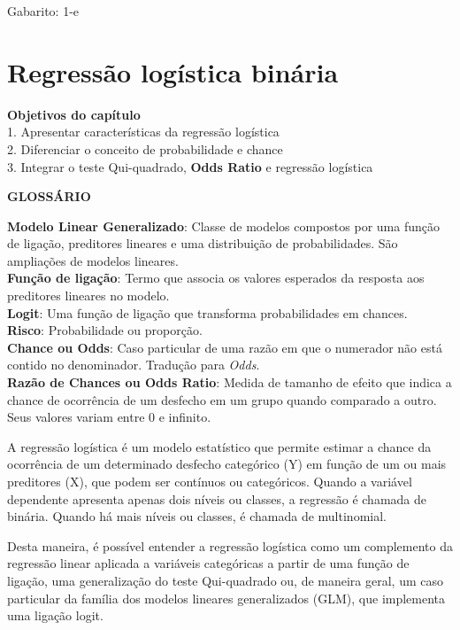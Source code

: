\documentclass[
]{book}
\newenvironment{objectives}{
  \definecolor{shadecolor}{rgb}{0.764,0.992,0.686}  %
  \color{black}
  \begin{shaded}}
 {\end{shaded}}
\begin{document}
Gabarito: 1-e

\hypertarget{regressuxe3o-loguxedstica-binuxe1ria}{%
\chapter{Regressão logística binária}\label{regressuxe3o-loguxedstica-binuxe1ria}}

\begin{objectives}
\textbf{Objetivos do capítulo}\\
1. Apresentar características da regressão logística\\
2. Diferenciar o conceito de probabilidade e chance\\
3. Integrar o teste Qui-quadrado, \textbf{Odds Ratio} e regressão logística

\end{objectives}

\textbf{GLOSSÁRIO}

\textbf{Modelo Linear Generalizado}: Classe de modelos compostos por uma função de ligação, preditores lineares e uma distribuição de probabilidades. São ampliações de modelos lineares.\\
\textbf{Função de ligação}: Termo que associa os valores esperados da resposta aos preditores lineares no modelo.\\
\textbf{Logit}: Uma função de ligação que transforma probabilidades em chances.\\
\textbf{Risco}: Probabilidade ou proporção.\\
\textbf{Chance ou Odds}: Caso particular de uma razão em que o numerador não está contido no denominador. Tradução para \emph{Odds}.\\
\textbf{Razão de Chances ou Odds Ratio}: Medida de tamanho de efeito que indica a chance de ocorrência de um desfecho em um grupo quando comparado a outro. Seus valores variam entre 0 e infinito.

A regressão logística é um modelo estatístico que permite estimar a chance da ocorrência de um determinado desfecho categórico (Y) em função de um ou mais preditores (X), que podem ser contínuos ou categóricos. Quando a variável dependente apresenta apenas dois níveis ou classes, a regressão é chamada de binária. Quando há mais níveis ou classes, é chamada de multinomial.

Desta maneira, é possível entender a regressão logística como um complemento da regressão linear aplicada a variáveis categóricas a partir de uma função de ligação, uma generalização do teste Qui-quadrado ou, de maneira geral, um caso particular da família dos modelos lineares generalizados (GLM), que implementa uma ligação logit.
\end{document}

